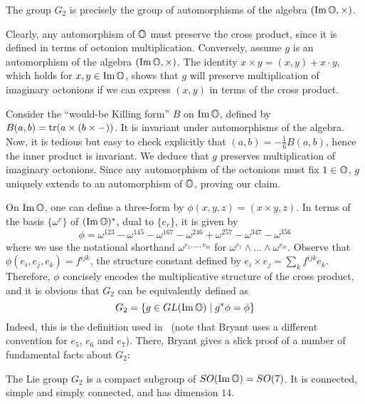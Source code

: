 \begin{prop}
	The group $G_2$ is precisely the group of automorphisms of the algebra $(\operatorname{Im}\mathbb{O},\times)$.
\end{prop}
\begin{myproof}
	Clearly, any automorphism of $\mathbb{O}$ must preserve the cross product, since it is defined in terms of octonion multiplication. Conversely, assume $g$ is an automorphism of the algebra $(\operatorname{Im}\mathbb{O},\times)$. The identity $x\times y=(x,y)+x\cdot y$, which holds for $x,y\in\operatorname{Im}\mathbb{O}$, shows that $g$ will preserve multiplication of imaginary octonions if we can express $(x,y)$ in terms of the cross product. 
	
	Consider the ``would-be Killing form'' $B$ on $\operatorname{Im}\mathbb{O}$, defined by $B(a,b)=\operatorname{tr} (a\times (b\times -))$. It is invariant under automorphisms of the algebra. Now, it is tedious but easy to check explicitly that $(a,b)=-\frac{1}{6}B(a,b)$, hence the inner product is invariant. We deduce that $g$ preserves multiplication of imaginary octonions. Since any automorphism of the octonions must fix $1\in \mathbb{O}$, $g$ uniquely extends to an automorphism of $\mathbb{O}$, proving our claim.
\end{myproof}

On $\operatorname{Im}\mathbb{O}$, one can define a three-form by $\phi(x,y,z)=(x\times y,z)$. In terms of the basis $\{\omega^r\}$ of $(\operatorname{Im} \mathbb{O})^*$, dual to $\{e_r\}$, it is given by
\begin{equation*}
	\phi=\omega^{123}-\omega^{145}-\omega^{167}-\omega^{246}
	+\omega^{257}-\omega^{347}-\omega^{356}
\end{equation*}
where we use the notational shorthand $\omega^{r_1,\dots,r_m}$ for $\omega^{r_1}\wedge\dots\wedge \omega^{r_m}$. Observe that $\phi(e_i,e_j,e_k)=f^{ijk}$, the structure constant defined by $e_i\times e_j=\sum_k f^{ijk}e_k$. Therefore, $\phi$ concisely encodes the multiplicative structure of the cross product, and it is obvious that $G_2$ can be equivalently defined as 
\begin{equation*}
	G_2=\{g\in GL(\operatorname{Im}\mathbb{O})\mid g^*\phi=\phi\}
\end{equation*}
Indeed, this is the definition used in~\cite{Bry1987} (note that Bryant uses a different convention for $e_5$, $e_6$ and $e_7$). There, Bryant gives a slick proof of a number of fundamental facts about $G_2$:

\begin{thm}
	The Lie group $G_2$ is a compact subgroup of $SO(\operatorname{Im}\mathbb{O})=SO(7)$. It is connected, simple and simply connected, and has dimension $14$.
\end{thm}

